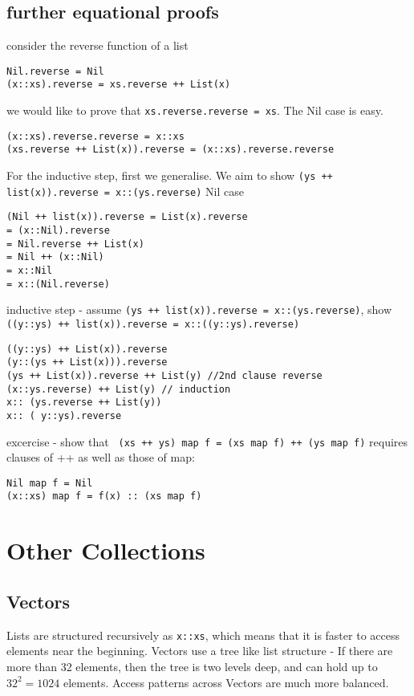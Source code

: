 \subsection{ further equational proofs}

consider the reverse function of a list

\begin{lstlisting}
Nil.reverse = Nil
(x::xs).reverse = xs.reverse ++ List(x)
\end{lstlisting}

we would like to prove that \lstinline|xs.reverse.reverse = xs|. The Nil case is easy. 
\begin{lstlisting}
(x::xs).reverse.reverse = x::xs
(xs.reverse ++ List(x)).reverse = (x::xs).reverse.reverse
\end{lstlisting}

For the inductive step, first we generalise. We aim to show \lstinline|(ys ++ list(x)).reverse = x::(ys.reverse)|
Nil case
\begin{lstlisting}
(Nil ++ list(x)).reverse = List(x).reverse 
= (x::Nil).reverse 
= Nil.reverse ++ List(x)
= Nil ++ (x::Nil)
= x::Nil
= x::(Nil.reverse)
\end{lstlisting}

inductive step - assume \lstinline|(ys ++ list(x)).reverse = x::(ys.reverse)|, show \lstinline|((y::ys) ++ list(x)).reverse = x::((y::ys).reverse)|

\begin{lstlisting}
((y::ys) ++ List(x)).reverse
(y::(ys ++ List(x))).reverse
(ys ++ List(x)).reverse ++ List(y) //2nd clause reverse
(x::ys.reverse) ++ List(y) // induction
x:: (ys.reverse ++ List(y))
x:: ( y::ys).reverse
\end{lstlisting}


excercise - show that \lstinline| (xs ++ ys) map f = (xs map f) ++ (ys map f)|
requires clauses of ++ as well as those of map:
\begin{lstlisting}
Nil map f = Nil
(x::xs) map f = f(x) :: (xs map f)
\end{lstlisting}

\section{ Other Collections}
\subsection{Vectors}

Lists are structured recursively as \lstinline|x::xs|, which means that it is faster to access elements near the beginning. Vectors use a tree like list structure - If there are more than 32 elements, then the tree is two levels deep, and can hold up to $32^2 = 1024$ elements. Access patterns across Vectors are much more balanced.

